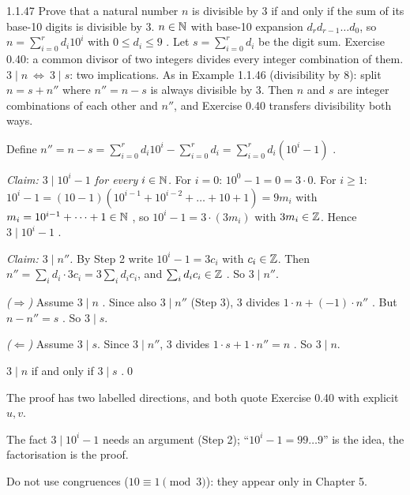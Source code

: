 \begin{bookex}[essential]{1.1.47}
Prove that a natural number $n$ is divisible by $3$ if and only if the sum of its base-10 digits is divisible by $3$.
\solution
\given $n\in\mathbb{N}$ with base-10 expansion $d_rd_{r-1}\dots d_0$, so $n=\sum_{i=0}^rd_i10^i$ with $0\le d_i\le9$ . Let $s=\sum_{i=0}^rd_i$ be the digit sum. Exercise 0.40: a common divisor of two integers divides every integer combination of them.
\goal $3\mid n\ \Leftrightarrow\ 3\mid s$: two implications.
\plan As in Example 1.1.46 (divisibility by $8$): split $n=s+n''$ where $n''=n-s$ is always divisible by $3$. Then $n$ and $s$ are integer combinations of each other and $n''$, and Exercise 0.40 transfers divisibility both ways.
\begin{steps}
\item Define $n''=n-s=\sum_{i=0}^rd_i10^i-\sum_{i=0}^rd_i=\sum_{i=0}^rd_i(10^i-1)$ .
\item \emph{Claim: $3\mid10^i-1$ for every $i\in\mathbb{N}$.} For $i=0$: $10^0-1=0=3\cdot0$. For $i\ge1$: $10^i-1=(10-1)(10^{i-1}+10^{i-2}+\dots+10+1)=9m_i$ with $m_i=10^{i-1}+\dots+1\in\mathbb{N}$ , so $10^i-1=3\cdot(3m_i)$ with $3m_i\in\mathbb{Z}$. Hence $3\mid10^i-1$ .
\item \emph{Claim: $3\mid n''$.} By Step 2 write $10^i-1=3c_i$ with $c_i\in\mathbb{Z}$. Then $n''=\sum_id_i\cdot3c_i=3\sum_id_ic_i$, and $\sum_id_ic_i\in\mathbb{Z}$ . So $3\mid n''$.
\item \emph{($\Rightarrow$)} Assume $3\mid n$ . Since also $3\mid n''$ (Step 3), $3$ divides $1\cdot n+(-1)\cdot n''$ . But $n-n''=s$ . So $3\mid s$.
\item \emph{($\Leftarrow$)} Assume $3\mid s$. Since $3\mid n''$, $3$ divides $1\cdot s+1\cdot n''=n$ . So $3\mid n$.
\end{steps}
\conclusion $3\mid n$ if and only if $3\mid s$ .\qed
\begin{compare}
\item The proof has two labelled directions, and both quote Exercise 0.40 with explicit $u,v$.
\item The fact $3\mid10^i-1$ needs an argument (Step 2); ``$10^i-1=99\dots9$'' is the idea, the factorisation is the proof.
\item Do not use congruences ($10\equiv1\pmod3$): they appear only in Chapter 5.
\end{compare}
\end{bookex}

